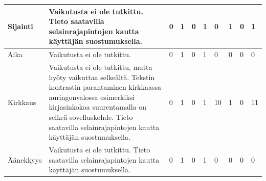 \documentclass[finnish, 12pt, a4paper, elec, utf8, a-1b, online]{aaltothesis}
\begin{document}
{\begin{longtable}{p{2.5cm}|p{6cm}|p{0.5cm}p{0.5cm}p{0.5cm}|p{0.5cm}|p{0.5cm}p{0.5cm}p{0.5cm}|p{0.5cm}|}
    \midrule
    Sijainti                               & Vaikutusta ei ole tutkittu. Tieto saatavilla selainrajapintojen kautta käyttäjän suostumuksella.                                                                                                                                                              & 0                                          & 1                                   & 0                                      & 1                            & 0                                               & 1                                         & 0                                         & 1                            \\
    \midrule
    Aika                                   & Vaikutusta ei ole tutkittu.                                                                                                                                                                                                                                   & 0                                          & 1                                   & 0                                      & 1                            & 0                                               & 0                                         & 0                                         & 0                            \\
    \midrule
    Kirkkaus                               & Vaikutusta ei ole tutkittu, mutta hyöty vaikuttaa selkeältä. Tekstin kontrastin parantaminen kirkkaassa auringonvalossa esimerkiksi kirjasinkokoa suurentamalla on selkeä sovelluskohde. Tieto saatavilla selainrajapintojen kautta käyttäjän suostumuksella. & 0                                          & 1                                   & 0                                      & 1                            & 10                                              & 1                                         & 0                                         & 11                           \\
    \midrule
    Äänekkyys                              & Vaikutusta ei ole tutkittu. Tieto saatavilla selainrajapintojen kautta käyttäjän suostumuksella.                                                                                                                                                              & 0                                          & 1                                   & 0                                      & 1                            & 0                                               & 0                                         & 0                                         & 0                            \\

\end{longtable}}
\end{document}
